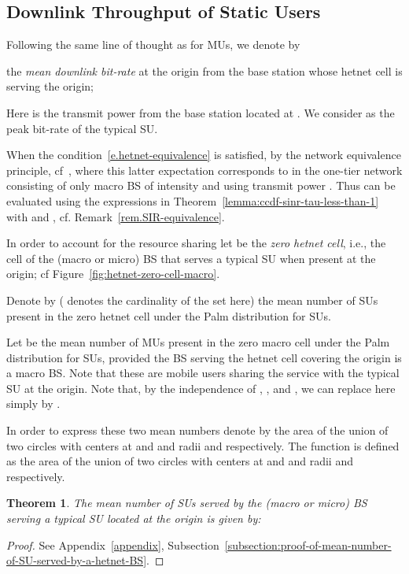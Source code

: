\documentclass[10pt,journal]{IEEEtran}
\newtheorem{theorem}{Theorem}
\begin{document}
\subsection{Downlink Throughput of Static Users}
\label{ss.SU-throughput}
Following the same line of thought as for MUs, we 
denote by
  
 the {\em mean downlink bit-rate} at
  the origin from the base station whose hetnet cell is serving the
  origin;

Here  is the transmit power from the base station located at . 
We consider  as the peak bit-rate of the typical  SU.

When the condition~\eqref{e.hetnet-equivalence} is satisfied, by  the
network equivalence principle, cf~\cite{netequivalence,bartek-keeler15sinr-process-poisson-networks-factorial-moment-measures}, 
 where  this latter expectation
corresponds to  in the one-tier  network consisting
of only macro BS of intensity  and using transmit power . 
Thus  can be evaluated using the expressions in
Theorem~\ref{lemma:ccdf-sinr-tau-less-than-1} with  and 
, cf. Remark~\ref{rem.SIR-equivalence}.

In order to account for the resource sharing let  
be the {\em zero hetnet cell}, i.e., the cell
  of the (macro or micro) BS that serves a typical SU when present at
  the origin; cf Figure~\ref{fig:hetnet-zero-cell-macro}.  

Denote by  ( denotes the 
cardinality of the set here) 
the mean number of SUs present in the zero hetnet cell under the Palm distribution for SUs. 

Let  
be the mean number of MUs present in the zero macro  cell
under the Palm distribution for SUs, provided the BS serving the hetnet cell covering
the origin is a macro BS. Note that these are mobile users sharing the
service with the typical SU  at the origin. Note that, by the independence of 
, ,  and , 
we can replace  here simply by .

In order to express these two mean numbers denote by 
  the area of the union of two circles 
 with centers at  and  and radii  
 and  respectively. The function 
  is defined as the area of the union of two circles 
 with centers at  and  and radii  
 and  respectively. 

\begin{theorem}\label{theorem:mean-number-of-SU-served-by-a-hetnet-BS}
The mean number of SUs served by the (macro or micro) BS serving a typical SU located at the origin is given by:
\footnotesize

\normalsize
 \end{theorem}
\begin{proof}
 See Appendix~\ref{appendix}, Subsection~\ref{subsection:proof-of-mean-number-of-SU-served-by-a-hetnet-BS}.
\end{proof}
\end{document}
